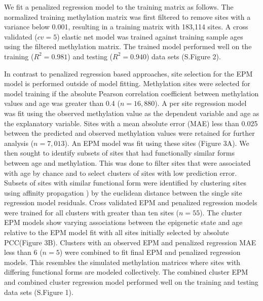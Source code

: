 \documentclass{article}
\begin{document}
{{\begin{linenumbers}
We fit a penalized regression model to the training matrix as follows. The normalized training methylation matrix was 
first filtered to remove sites with a variance below 0.001, resulting in a training matrix with 183,114 sites. A 
cross validated ($cv=5$) elastic net model was trained against training sample ages using the filtered methylation 
matrix. The trained model performed well on the training ($R^2=0.981$) and testing ($R^2=0.940$) data sets (S.Figure 2). 

In contrast to penalized regression based approaches, site selection for the EPM model is performed outside of model 
fitting. Methylation sites were selected for model training if the absolute Pearson correlation coefficient between 
methylation values and age was greater than 0.4 ($n=16,880$). A per site regression model was fit using the observed 
methylation value as the dependent variable and age as the explanatory variable. Sites with a mean absolute error 
(MAE) less than 0.025 between the predicted and observed methylation values were retained for further analysis 
($n=7,013$). An EPM model was fit using these sites (Figure 3A). We then sought to identify subsets of sites that 
had functionally similar forms between age and methylation. This was done to filter sites that were associated with 
age by chance and to select clusters of sites with low prediction error. Subsets of sites with similar functional form 
were identified by clustering sites using affinity propagation \cite{Frey2007-mu}) by the euclidean distance between 
the single site regression model residuals. Cross validated EPM and penalized regression models were trained for all 
clusters with greater than ten sites ($n=55$). The cluster EPM models show varying associations between the epigenetic 
state and age relative to the EPM model fit with all sites initially selected by absolute PCC(Figure 3B). Clusters 
with an observed EPM and penalized regression MAE less than 6 ($n=5$) were combined to fit final EPM and penalized 
regression models. This resembles the simulated methylation matrices where sites with differing functional forms are 
modeled collectively. The combined cluster EPM and combined cluster regression model performed well on the training 
and testing data sets (S.Figure 1). 


\end{linenumbers}}}
\end{document}
